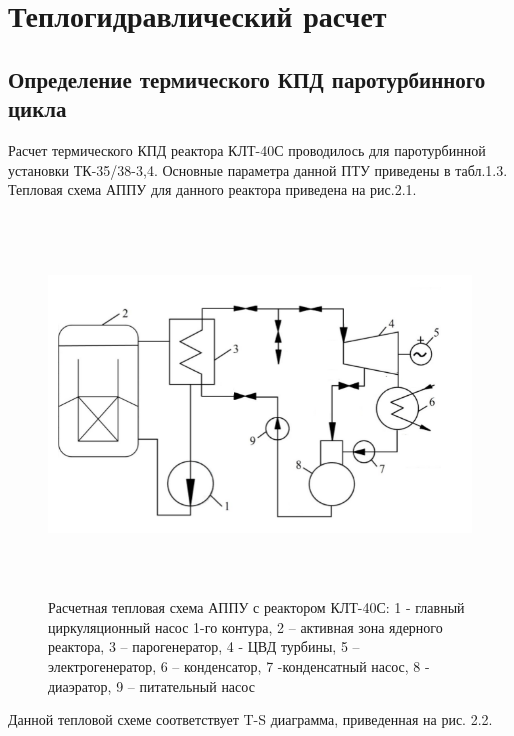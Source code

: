 \chapter{Теплогидравлический расчет}
\section{Определение термического КПД паротурбинного цикла}

Расчет термического КПД реактора КЛТ-40С проводилось для паротурбинной
установки ТК-35/38-3,4. Основные параметра данной ПТУ приведены в
табл.1.3. Тепловая схема АППУ для данного реактора приведена на рис.2.1.

\begin{figure}[!h]
\center
\includegraphics[width=6.49583in,height=3.95764in]{media/image4.png}
\caption{Расчетная тепловая схема АППУ с реактором КЛТ-40С: 1 -
главный циркуляционный насос 1-го контура, 2 -- активная зона ядерного
реактора, 3 -- парогенератор, 4 - ЦВД турбины, 5 -- электрогенератор, 6
-- конденсатор, 7 -конденсатный насос, 8 - диаэратор, 9 -- питательный
насос}
\end{figure}

Данной тепловой схеме соответствует T-S диаграмма, приведенная на рис.
2.2.

